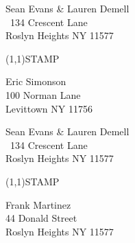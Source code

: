 \documentclass[12pt]{article}
\begin{document}
\begin{minipage}{.5\linewidth} \noindent
Sean Evans \& Lauren Demell\\\ 
134 Crescent Lane\\ 
Roslyn Heights NY 11577
\end{minipage}
\begin{minipage}{.5\linewidth \hspace{-.2in} \vspace{-.3in}}
\begin{flushright}
\framebox(1,1){STAMP}
\end{flushright}
\end{minipage}

\begin{center} \begin{Huge} \vspace*{\fill}
Eric Simonson\\
100 Norman Lane\\
Levittown NY 11756\\
\vspace{\fill} \end{Huge} \end{center}

\clearpage

\begin{minipage}{.5\linewidth} \noindent
Sean Evans \& Lauren Demell\\\ 
134 Crescent Lane\\ 
Roslyn Heights NY 11577
\end{minipage}
\begin{minipage}{.5\linewidth \hspace{-.2in} \vspace{-.3in}}
\begin{flushright}
\framebox(1,1){STAMP}
\end{flushright}
\end{minipage}

\begin{center} \begin{Huge} \vspace*{\fill}
Frank Martinez\\
44 Donald Street\\
Roslyn Heights NY 11577\\
\vspace{\fill} \end{Huge} \end{center}

\clearpage
\end{document}

